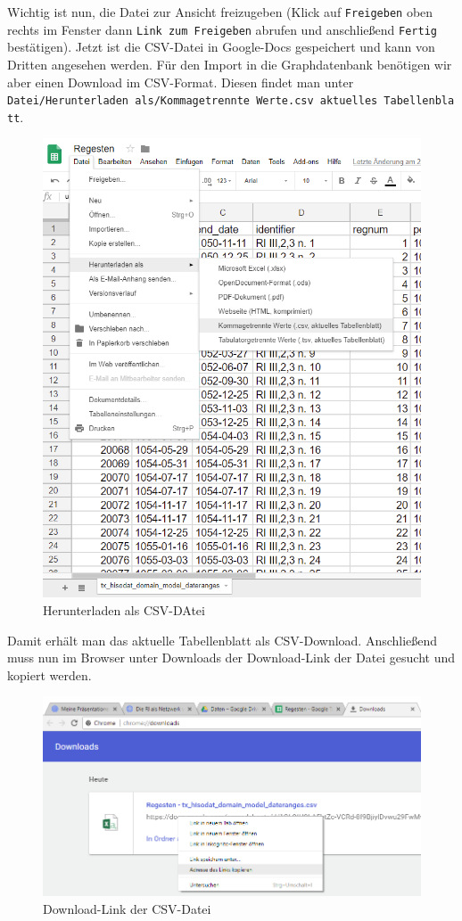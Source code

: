 \documentclass[ngerman,]{scrreprt}
\begin{document}
Wichtig ist nun, die Datei zur Ansicht freizugeben (Klick auf \texttt{Freigeben} oben rechts im Fenster dann \texttt{Link\ zum\ Freigeben} abrufen und anschließend \texttt{Fertig} bestätigen). Jetzt ist die CSV-Datei in Google-Docs gespeichert und kann von Dritten angesehen werden. Für den Import in die Graphdatenbank benötigen wir aber einen Download im CSV-Format. Diesen findet man unter \texttt{Datei/Herunterladen\ als/Kommagetrennte\ Werte.csv\ aktuelles\ Tabellenblatt}.

\begin{figure}
\centering
\includegraphics{Bilder/RI2Graph/google-docs-herunterladen-csv.png}
\caption{Herunterladen als CSV-DAtei}
\end{figure}

Damit erhält man das aktuelle Tabellenblatt als CSV-Download. Anschließend muss nun im Browser unter Downloads der Download-Link der Datei gesucht und kopiert werden.

\begin{figure}
\centering
\includegraphics{Bilder/RI2Graph/google-docs-link-kopieren.png}
\caption{Download-Link der CSV-Datei}
\end{figure}
\end{document}
